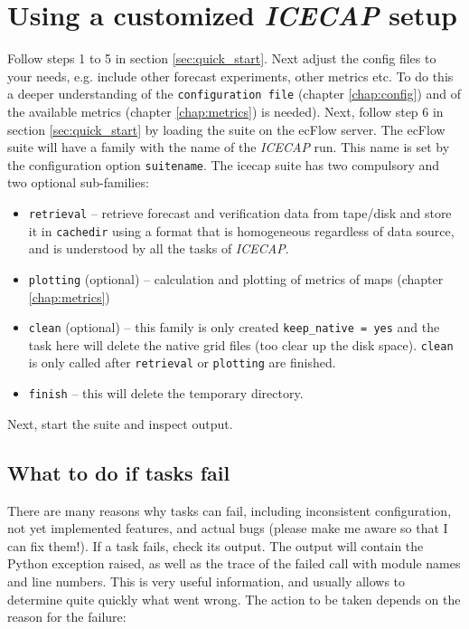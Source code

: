 \documentclass[DIV=10, parskip=full]{scrreprt}
\newcommand{\ice}{\textit{ICECAP}\xspace}
\begin{document}
\section{Using a customized \ice setup} 
Follow steps 1 to 5 in section \ref{sec:quick_start}. Next adjust the config files to your needs, e.g. include other forecast experiments, other metrics etc. To do this a deeper understanding of the \texttt{configuration file} (chapter \ref{chap:config}) and of the available metrics (chapter \ref{chap:metrics}) is needed). Next, follow step 6 in section \ref{sec:quick_start} by loading the suite on the ecFlow server. The ecFlow suite will have a family with the name of the \ice run. This name is set by the configuration option \texttt{suitename}. The icecap suite has two compulsory and two optional sub-families:

\begin{itemize}
	\item \texttt{retrieval} -- retrieve forecast and verification data from tape/disk and store it in \texttt{cachedir} using a format that is homogeneous regardless of data source, and is understood by all the tasks of \ice. 
	\item \texttt{plotting} (optional) -- calculation and plotting of metrics of maps (chapter \ref{chap:metrics})
	\item \texttt{clean} (optional) -- this family is only created \texttt{keep\_native = yes} and the task here will delete the native grid files (too clear up the disk space). \texttt{clean} is only called after \texttt{retrieval} or \texttt{plotting} are finished. 
	\item \texttt{finish} -- this will delete the temporary directory.
\end{itemize}

Next, start the suite and inspect output. 

\subsection{What to do if tasks fail}
There are many reasons why tasks can fail, including inconsistent configuration, not yet implemented features, and actual bugs (please make me aware so that I can fix them!). If a task fails, check its output. The output will contain the Python exception raised, as well as the trace of the failed call with module names and line numbers. This is very useful information, and usually allows to determine quite quickly what went wrong. The action to be taken depends on the reason for the failure:\\
\end{document}
